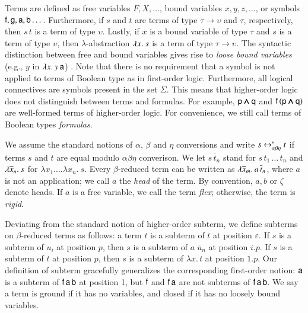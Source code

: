 Terms are defined as free variables $F, X, \ldots$, bound variables $x, y, z,
\dotsc$, or symbols $\mathsf{f}, \mathsf{g},\allowbreak \mathsf{a},\allowbreak \mathsf{b}
\dotsc$. Furthermore, if $s$ and $t$ are terms of type $\tau \rightarrow
\upsilon$ and $\tau$, respectively, then $s \, t$ is a term of type $\upsilon$.
Lastly, if $x$ is a bound variable of type $\tau$ and $s$ is a term of type
$\upsilon$, then $\lambda$-abstraction $\lambda x.\> s$ is a term of type $\tau
\rightarrow \upsilon$. The syntactic distinction between free and bound variables
gives rise to \emph{loose bound variables} (e.g., $y$ in $\lambda x.\> y \, \mathsf{a}$)
\cite{tn-93-patterns}. Note that there is no requirement that a symbol is not
applied to terms of Boolean type as in first-order logic. Furthermore, all
logical connectives are symbols present in the set $\Sigma$. This means that
higher-order logic does not distinguish between terms and formulas. For example,
$\mathsf{p} \pmb\land \mathsf{q}$ and $\mathsf{f} \, (\mathsf{p} \pmb\land \mathsf{q})$ are well-formed
terms of higher-order logic. For convenience, we still call terms of Boolean
types \emph{formulas}.

We assume the standard notions of $\alpha$, $\beta$ and $\eta$ conversions and
write $s \leftrightarrow^*_{\alpha\beta\eta} t$ if terms $s$ and $t$ are equal modulo $\alpha\beta\eta$
converison. We let $s \, \overline{t}_n$ stand for $s \, t_1 \, \ldots \, t_n$
and $\lambda \overline{x}_n.\> s$ for $\lambda x_1. \ldots \lambda x_n. \> s$. Every
$\beta$-reduced term can be written as $\lambda \overline{x}_{m}.\> a \, \overline{t}_{n}$,
where $a$ is not an application; we call $a$ the \emph{head} of the term. By
convention, $a, b$ or $\zeta$ denote heads. If $a$ is a free variable, we call the term
\emph{flex}; otherwise, the term is \emph{rigid}.

Deviating from the standard notion of higher-order subterm, we define subterms
on $\beta$-reduced terms as follows: a term $t$ is a subterm of $t$ at position
$\varepsilon$. If $s$ is a subterm of $u_i$ at position $p$, then $s$ is a
subterm of $a\;\overline{u}_n$ at position $i.p$. If $s$ is a subterm of $t$ at
position $p$, then $s$ is a subterm of $\lambda x.\, t$ at position $1.p$. Our
definition of subterm gracefully generalizes the corresponding first-order
notion: $\mathsf{a}$ is a subterm of $\mathsf{f} \, \mathsf{a} \, \mathsf{b}$ at position 1,
but $\mathsf{f}$ and $\mathsf{f} \, \mathsf{a}$ are not subterms of $\mathsf{f} \, \mathsf{a}
\, \mathsf{b}$. We say a term is ground if it has no variables, and closed
if it has no loosely bound variables.

